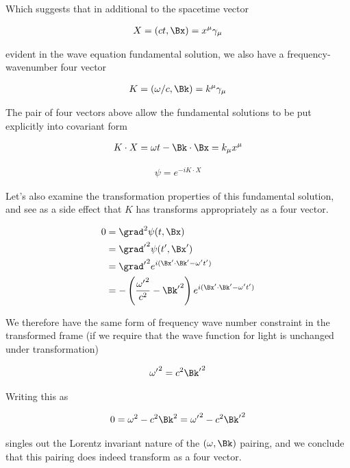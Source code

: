 Which suggests that in additional to the spacetime vector

\begin{align}
X = (ct, \Bx) = x^\mu \gamma_\mu
\end{align}

evident in the wave equation fundamental solution, we also have a frequency-wavenumber four vector

\begin{align}
K = (\omega/c, \Bk) = k^\mu \gamma_\mu
\end{align}

The pair of four vectors above allow the fundamental solutions to be put explicitly into covariant form

\begin{align}
K \cdot X = \omega t - \Bk \cdot \Bx = k_\mu x^\mu
\end{align}

\begin{align}
\psi = e^{-i K \cdot X}
\end{align}

Let's also examine the transformation properties of this fundamental solution, and see as a side effect that $K$
has transforms appropriately as a four vector.

\begin{align*}
0 &= \grad^2 \psi(t,\Bx) \\
&= {\grad'}^2 \psi(t',\Bx') \\
&= {\grad'}^2 e^{i(\Bx' \cdot \Bk' - \omega' t')} \\
&= -\left(\frac{{\omega'}^2}{c^2} - {\Bk'}^2 \right) e^{i(\Bx' \cdot \Bk' - \omega' t')} \\
\end{align*}

We therefore have the same form of frequency wave number constraint in the transformed frame (if we require that
the wave function for light is unchanged under transformation)

\begin{align}
{\omega'}^2 = c^2 {\Bk'}^2 
\end{align}

Writing this as

\begin{align}
0 = {\omega}^2 - c^2 {\Bk}^2 = {\omega'}^2 - c^2 {\Bk'}^2 
\end{align}

singles out the Lorentz invariant nature of the $(\omega, \Bk)$ pairing, and we conclude that this pairing 
does indeed transform as a four vector.

